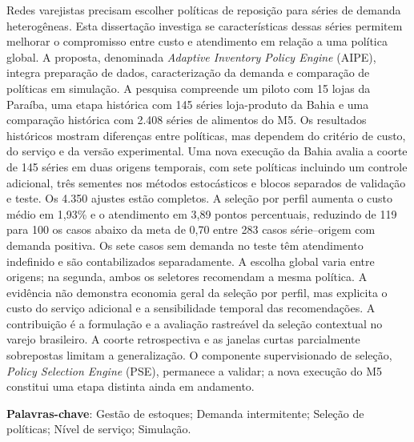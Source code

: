 Redes varejistas precisam escolher políticas de reposição para séries de demanda heterogêneas. Esta dissertação investiga se características dessas séries permitem melhorar o compromisso entre custo e atendimento em relação a uma política global. A proposta, denominada \textit{Adaptive Inventory Policy Engine} (AIPE), integra preparação de dados, caracterização da demanda e comparação de políticas em simulação. A pesquisa compreende um piloto com 15 lojas da Paraíba, uma etapa histórica com 145 séries loja-produto da Bahia e uma comparação histórica com 2.408 séries de alimentos do M5. Os resultados históricos mostram diferenças entre políticas, mas dependem do critério de custo, do serviço e da versão experimental. Uma nova execução da Bahia avalia a coorte de 145 séries em duas origens temporais, com sete políticas incluindo um controle adicional, três sementes nos métodos estocásticos e blocos separados de validação e teste. Os 4.350 ajustes estão completos. A seleção por perfil aumenta o custo médio em 1,93\% e o atendimento em 3,89 pontos percentuais, reduzindo de 119 para 100 os casos abaixo da meta de 0,70 entre 283 casos série--origem com demanda positiva. Os sete casos sem demanda no teste têm atendimento indefinido e são contabilizados separadamente. A escolha global varia entre origens; na segunda, ambos os seletores recomendam a mesma política. A evidência não demonstra economia geral da seleção por perfil, mas explicita o custo do serviço adicional e a sensibilidade temporal das recomendações. A contribuição é a formulação e a avaliação rastreável da seleção contextual no varejo brasileiro. A coorte retrospectiva e as janelas curtas parcialmente sobrepostas limitam a generalização. O componente supervisionado de seleção, \textit{Policy Selection Engine} (PSE), permanece a validar; a nova execução do M5 constitui uma etapa distinta ainda em andamento.

\vspace{2em}
\textbf{Palavras-chave}: Gestão de estoques; Demanda intermitente; Seleção de políticas; Nível de serviço; Simulação.
